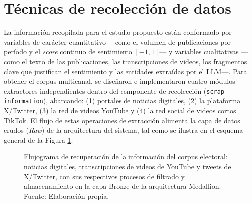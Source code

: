 \section{Técnicas de recolección de datos}
 
La información recopilada para el estudio propuesto están conformado por variables de carácter cuantitativo —como el volumen de publicaciones por período y el \textit{score} continuo de sentimiento $[-1, 1]$— y variables cualitativas —como el texto de las publicaciones, las transcripciones de videos, los fragmentos clave que justifican el sentimiento y las entidades extraídas por el LLM—. Para obtener el corpus multicanal, se diseñaron e implementaron cuatro módulos extractores independientes dentro del componente de recolección (\texttt{scrap-information}), abarcando: (1) portales de noticias digitales, (2) la plataforma X/Twitter, (3) la red de videos YouTube y (4) la red social de videos cortos TikTok. El flujo de estas operaciones de extracción alimenta la capa de datos crudos (\textit{Raw}) de la arquitectura del sistema, tal como se ilustra en el esquema general de la Figura \ref{4:fig1}.
 
\begin{figure}[!ht]
    \begin{center}
        \resizebox{0.95\textwidth}{!}{}
        \caption[Flujograma de recolección de los conjuntos de datos del corpus electoral]{Flujograma de recuperación de la información del corpus electoral: noticias digitales, transcripciones de videos de YouTube y tweets de X/Twitter, con sus respectivos procesos de filtrado y almacenamiento en la capa Bronze de la arquitectura Medallion.\\
            Fuente: Elaboración propia.}
        \label{4:fig1}
    \end{center}
\end{figure}
 
